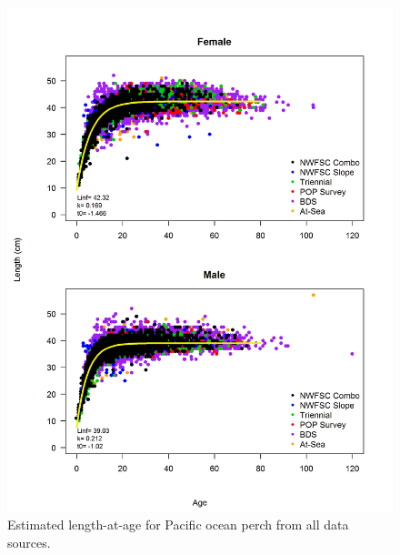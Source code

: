 \documentclass[12pt,]{article}
\begin{document}
\begin{figure}
\centering
\includegraphics{Figures/LengthAgeAll.png}
\caption{Estimated length-at-age for Pacific ocean perch from all data
sources. \label{fig:Len_Age}}
\end{figure}
\end{document}
